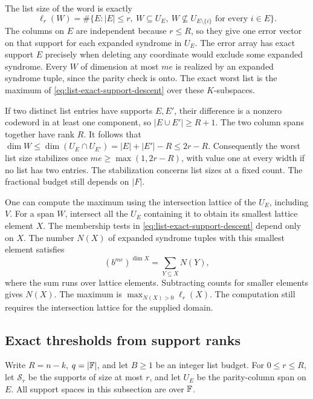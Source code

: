 The list size of the word is exactly
\begin{equation}
 \ell_r(W)=\#\{E:|E|\le r,\ W\subseteq U_E,\
         W\nsubseteq U_{E\setminus\{i\}}\text{ for every }i\in E\}.
 \label{eq:list-exact-support-descent}
\end{equation}
The columns on \(E\) are independent because \(r\le R\), so they give
one error vector on that support for each expanded syndrome in \(U_E\).
The error array has exact support \(E\) precisely when deleting any
coordinate would exclude some expanded syndrome. Every \(W\) of dimension
at most \(me\) is realized by an expanded syndrome tuple, since the parity
check is onto. The exact worst list is the maximum of
\eqref{eq:list-exact-support-descent} over these \(K\)-subspaces.

If two distinct list entries have supports \(E,E'\), their difference is
a nonzero codeword in at least one component, so \(|E\cup E'|\ge R+1\).
The two column spans together have rank \(R\). It follows that
\(\dim W\le\dim(U_E\cap U_{E'})=|E|+|E'|-R\le2r-R\).
Consequently the worst list size stabilizes once
\(me\ge\max(1,2r-R)\), with value one at every width if no list has
two entries. The stabilization concerns list sizes at a fixed count.
The fractional budget still depends on \(|F|\).

One can compute the maximum using the intersection lattice of the \(U_E\),
including \(V\). For a span \(W\), intersect all the \(U_E\) containing
it to obtain its smallest lattice element \(X\). The membership tests in
\eqref{eq:list-exact-support-descent} depend only on \(X\). The number
\(N(X)\) of expanded syndrome tuples with this smallest element satisfies
\[
 (b^{me})^{\dim X}=\sum_{Y\subseteq X}N(Y),
\]
where the sum runs over lattice elements. Subtracting counts for smaller
elements gives \(N(X)\). The maximum is \(\max_{N(X)>0}\ell_r(X)\).
The computation still requires the intersection lattice for the supplied
domain.

\subsection{Exact thresholds from support ranks}
\label{sec:list-support-ranks}

Write \(R=n-k\), \(q=|\mathbb{F}|\), and let \(B\ge1\) be an integer list
budget. For \(0\le r\le R\), let \(\mathcal S_r\) be the supports of size
at most \(r\), and let \(U_E\) be the parity-column span on \(E\). All
support spaces in this subsection are over \(\mathbb{F}\).

